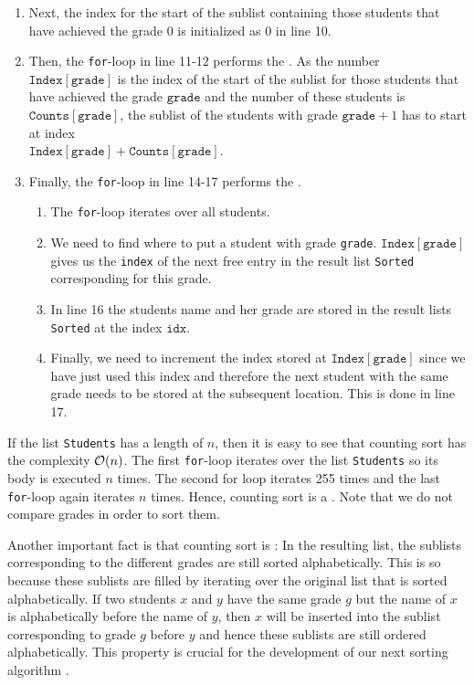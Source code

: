 \begin{enumerate}
\item Next, the index for the start of the sublist containing those students that have achieved the grade $0$
      is initialized as $0$ in line 10. 
\item Then, the \texttt{for}-loop in line 11-12 performs the . As the number
      $\texttt{Index}[\mathtt{grade}]$ is the index of the start of the sublist for those students that have
      achieved the grade  $\mathtt{grade}$ and the number of these
      students is $\texttt{Counts}[\mathtt{grade}]$, the sublist of the students with grade $\mathtt{grade}+1$
      has to start at index 
      \\[0.2cm]
      \hspace*{1.3cm}
      $\texttt{Index}[\mathtt{grade}] + \texttt{Counts}[\mathtt{grade}]$.
\item Finally, the \texttt{for}-loop in line 14-17 performs the .
      \begin{enumerate}
      \item The \texttt{for}-loop iterates over all students. 
      \item We need to find where to put a student with grade \texttt{grade}.
            $\texttt{Index}[\mathtt{grade}]$ gives us the \texttt{index} of the next free entry in the
            result list \texttt{Sorted} corresponding for this grade.
      \item In line 16 the students name and her grade are stored in the result lists \texttt{Sorted}
            at the index $\texttt{idx}$.
      \item Finally, we need to increment the index stored at $\texttt{Index}[\mathtt{grade}]$ since we have
            just used this index and therefore the next student with the same grade needs to be
            stored at the subsequent location.  This is done in line 17.
      \end{enumerate}
\end{enumerate}
If the list \texttt{Students} has a length of $n$, then it is easy to
see that counting sort has the complexity $\mathcal{O}(n)$.  The first \texttt{for}-loop iterates over the list \texttt{Students} so
its body is executed $n$ times.  The second for loop iterates 255 times and the last \texttt{for}-loop again
iterates $n$ times.  Hence, counting sort is a .  Note that we do not compare grades in
order to sort them.

Another important fact is that counting sort is : In the resulting list, the sublists
corresponding to the different grades are still sorted alphabetically.  This is so because these sublists are
filled by iterating over the original list that is sorted alphabetically.  If two students $x$ and $y$ have the
same grade $g$ but the name of $x$ is alphabetically before the name of $y$, then $x$ will be inserted into the
sublist corresponding to grade $g$ before $y$ and hence these sublists are still ordered alphabetically.  This property
is crucial for the development of our next sorting algorithm .

